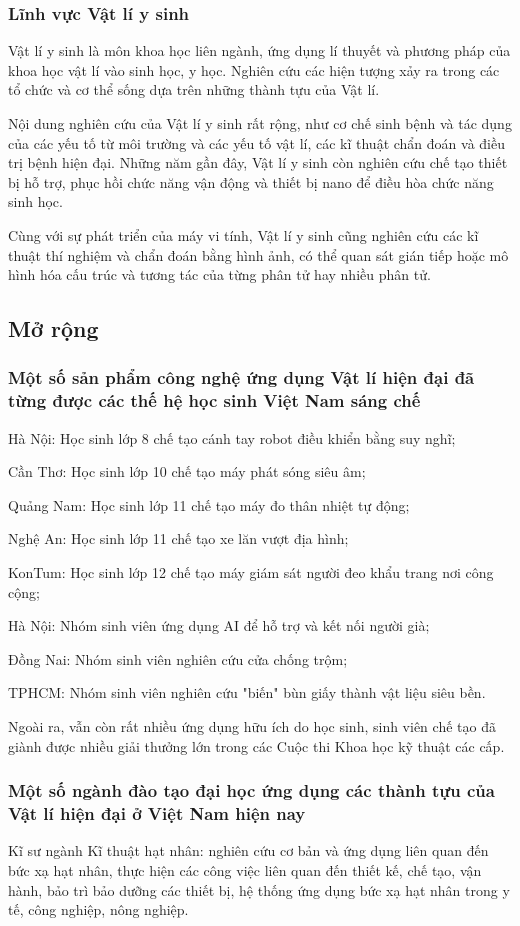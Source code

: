 \subsubsection{Lĩnh vực Vật lí y sinh}
Vật lí y sinh là môn khoa học liên ngành, ứng dụng lí thuyết và phương pháp của khoa học vật lí vào sinh học, y học. Nghiên cứu các hiện tượng xảy ra trong các tổ chức và cơ thể sống dựa trên những thành tựu của Vật lí.

Nội dung nghiên cứu của Vật lí y sinh rất rộng, như cơ chế sinh bệnh và tác dụng của các yếu tố từ môi trường và các yếu tố vật lí, các kĩ thuật chẩn đoán và điều trị bệnh hiện đại. Những năm gần đây, Vật lí y sinh còn nghiên cứu chế tạo thiết bị hỗ trợ, phục hồi chức năng vận động và thiết bị nano để điều hòa chức năng sinh học.

Cùng với sự phát triển của máy vi tính, Vật lí y sinh cũng nghiên cứu các kĩ thuật thí nghiệm và chẩn đoán bằng hình ảnh, có thể quan sát gián tiếp hoặc mô hình hóa cấu trúc và tương tác của từng phân tử hay nhiều phân tử.
\subsection{Mở rộng}
\subsubsection{Một số sản phẩm công nghệ ứng dụng Vật lí hiện đại đã từng được các thế hệ học sinh Việt Nam sáng chế}
Hà Nội: Học sinh lớp 8 chế tạo cánh tay robot điều khiển bằng suy nghĩ;

Cần Thơ: Học sinh lớp 10 chế tạo máy phát sóng siêu âm;

Quảng Nam: Học sinh lớp 11 chế tạo máy đo thân nhiệt tự động;

Nghệ An: Học sinh lớp 11 chế tạo xe lăn vượt địa hình;

KonTum: Học sinh lớp 12 chế tạo máy giám sát người đeo khẩu trang nơi công cộng;

Hà Nội: Nhóm sinh viên ứng dụng AI để hỗ trợ và kết nối người già;

Đồng Nai: Nhóm sinh viên nghiên cứu cửa chống trộm;

TPHCM: Nhóm sinh viên nghiên cứu "biến" bùn giấy thành vật liệu siêu bền.

Ngoài ra, vẫn còn rất nhiều ứng dụng hữu ích do học sinh, sinh viên chế tạo đã giành được nhiều giải thưởng lớn trong các Cuộc thi Khoa học kỹ thuật các cấp.

\subsubsection{Một số ngành đào tạo đại học ứng dụng các thành tựu của Vật lí hiện đại ở Việt Nam hiện nay}
Kĩ sư ngành Kĩ thuật hạt nhân: nghiên cứu cơ bản và ứng dụng liên quan đến bức xạ hạt nhân, thực hiện các công việc liên quan đến thiết kế, chế tạo, vận hành, bảo trì bảo dưỡng các thiết bị, hệ thống ứng dụng bức xạ hạt nhân trong y tế, công nghiệp, nông nghiệp.

